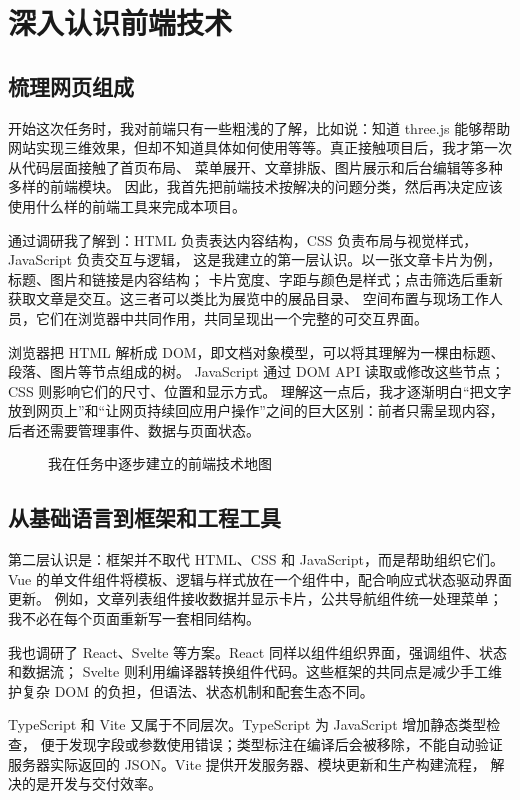 \section{深入认识前端技术}
\subsection{梳理网页组成}
开始这次任务时，我对前端只有一些粗浅的了解，比如说：知道 three.js 能够帮助网站实现三维效果，但却不知道具体如何使用等等。真正接触项目后，我才第一次从代码层面接触了首页布局、%
菜单展开、文章排版、图片展示和后台编辑等多种多样的前端模块。%
因此，我首先把前端技术按解决的问题分类，然后再决定应该使用什么样的前端工具来完成本项目。

通过调研我了解到：HTML 负责表达内容结构，CSS 负责布局与视觉样式，JavaScript 负责交互与逻辑，%
这是我建立的第一层认识\cite{mdn-basics}。以一张文章卡片为例，标题、图片和链接是内容结构；%
卡片宽度、字距与颜色是样式；点击筛选后重新获取文章是交互。这三者可以类比为展览中的展品目录、%
空间布置与现场工作人员，它们在浏览器中共同作用，共同呈现出一个完整的可交互界面。

浏览器把 HTML 解析成 DOM，即文档对象模型，可以将其理解为一棵由标题、段落、图片等节点组成的树。%
JavaScript 通过 DOM API 读取或修改这些节点；CSS 则影响它们的尺寸、位置和显示方式。%
理解这一点后，我才逐渐明白“把文字放到网页上”和“让网页持续回应用户操作”之间的巨大区别：前者只需呈现内容，%
后者还需要管理事件、数据与页面状态。

\begin{figure}[H]
\centering

\caption{我在任务中逐步建立的前端技术地图}%
\label{fig:map}
\end{figure}

\subsection{从基础语言到框架和工程工具}
第二层认识是：框架并不取代 HTML、CSS 和 JavaScript，而是帮助组织它们。%
Vue 的单文件组件将模板、逻辑与样式放在一个组件中，配合响应式状态驱动界面更新\cite{vue-intro}。%
例如，文章列表组件接收数据并显示卡片，公共导航组件统一处理菜单；我不必在每个页面重新写一套相同结构。

我也调研了 React、Svelte 等方案。React 同样以组件组织界面，强调组件、状态和数据流；%
Svelte 则利用编译器转换组件代码\cite{react-ui,svelte-overview}。这些框架的共同点是减少手工维护复杂
DOM 的负担，但语法、状态机制和配套生态不同。%


TypeScript 和 Vite 又属于不同层次。TypeScript 为 JavaScript 增加静态类型检查，%
便于发现字段或参数使用错误；类型标注在编译后会被移除，不能自动验证服务器实际返回的
JSON\cite{ts-basics}。Vite 提供开发服务器、模块更新和生产构建流程，%
解决的是开发与交付效率\cite{vite-why}。


